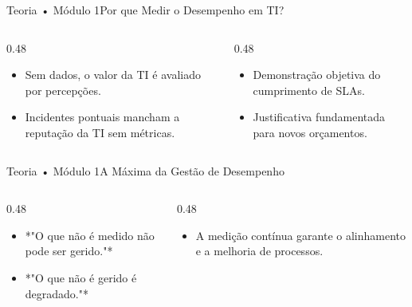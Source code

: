 \begin{senaiframe}{Teoria • Módulo 1}{Por que Medir o Desempenho em TI?}
  \begin{columns}[t]
    \begin{column}{0.48\textwidth}
      \begin{tcolorbox}[senaibluecard, title={Subjetividade vs. Fatos}]
        \begin{itemize}
          \item Sem dados, o valor da TI é avaliado por percepções.
          \item Incidentes pontuais mancham a reputação da TI sem métricas.
        \end{itemize}
      \end{tcolorbox}
    \end{column}
    \begin{column}{0.48\textwidth}
      \begin{tcolorbox}[senaigreencard, title={Comprovação de Resultados}]
        \begin{itemize}
          \item Demonstração objetiva do cumprimento de SLAs.
          \item Justificativa fundamentada para novos orçamentos.
        \end{itemize}
      \end{tcolorbox}
    \end{column}
  \end{columns}
\end{senaiframe}

\begin{senaiframe}{Teoria • Módulo 1}{A Máxima da Gestão de Desempenho}
  \begin{columns}[t]
    \begin{column}{0.48\textwidth}
      \begin{tcolorbox}[senaiambercard, title={Peter Drucker}]
        \begin{itemize}
          \item *"O que não é medido não pode ser gerido."*
          \item *"O que não é gerido é degradado."*
        \end{itemize}
      \end{tcolorbox}
    \end{column}
    \begin{column}{0.48\textwidth}
      \begin{tcolorbox}[senaicard, title={Aplicação na Governança}]
        \begin{itemize}
          \item A medição contínua garante o alinhamento e a melhoria de processos.
        \end{itemize}
      \end{tcolorbox}
    \end{column}
  \end{columns}
\end{senaiframe}


